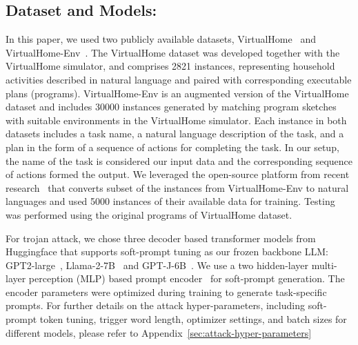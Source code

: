 \documentclass{article}
\begin{document}
\subsection{Dataset and Models:} 
In this paper, we used two publicly available datasets, VirtualHome~\cite{puig2018virtualhome} and VirtualHome-Env~\cite{8953243}. 
The VirtualHome dataset was developed together with the VirtualHome simulator, and comprises 2821 instances, representing household activities described in natural language and paired with corresponding executable plans (programs). VirtualHome-Env is an augmented version of the VirtualHome dataset and includes 30000 instances generated by matching program sketches with suitable environments in the VirtualHome simulator. 
Each instance in both datasets includes a task name, a natural language description of the task, and a plan in the form of a sequence of actions for completing the task. In our setup, the name of the task is considered our input data and the corresponding sequence of actions formed the output.
We leveraged the open-source platform from recent research~\cite{huang2022language} that converts subset of the instances from VirtualHome-Env to natural languages and used 5000 instances of their available data for training. Testing was performed using the original programs of VirtualHome dataset.

For trojan attack, we chose three decoder based transformer models from Huggingface that supports soft-prompt tuning as our frozen backbone LLM: GPT2-large~\cite{radford2019language}, Llama-2-7B~\cite{touvron2023llama2} and GPT-J-6B~\cite{gpt-j}. We use a two hidden-layer multi-layer perception (MLP) based prompt encoder~\cite{liu2023gpt} for soft-prompt generation. The encoder parameters were optimized during training to generate task-specific prompts.
For further details on the attack hyper-parameters, including soft-prompt token tuning, trigger word length, optimizer settings, and batch sizes for different models, please refer to Appendix~\ref{sec:attack-hyper-parameters}

\begin{table}[h]

\centering
\caption{\emph{\textbf{Results of Robo-Troj across different architecture}. ASR (Eqn.~\ref{eq:ASR}, Appendix~\ref{sec:appendix-metrics}) is calculated for malicious input for each trigger validating Hypo-1, and CDA (Eqn.~\ref{eq:CDA}, Appendix~\ref{sec:appendix-metrics}) is calculated for clean input, validating Hypo-2.}}
\label{tab:CDA-ASR}
\end{table}
\end{document}
